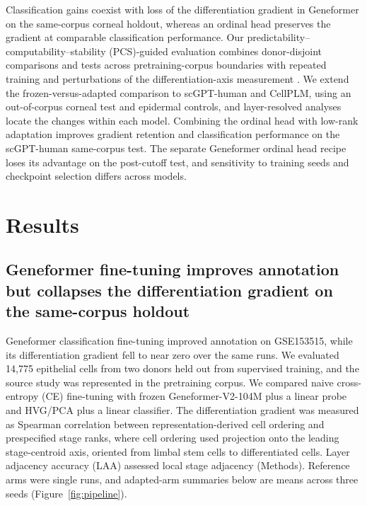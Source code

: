 \documentclass[12pt,letterpaper]{article}
\begin{document}
Classification gains coexist with loss of the differentiation gradient in Geneformer on the same-corpus corneal holdout, whereas an ordinal head preserves the gradient at comparable classification performance. Our predictability--computability--stability (PCS)-guided evaluation combines donor-disjoint comparisons and tests across pretraining-corpus boundaries with repeated training and perturbations of the differentiation-axis measurement \cite{ness2026}. We extend the frozen-versus-adapted comparison to scGPT-human and CellPLM, using an out-of-corpus corneal test and epidermal controls, and layer-resolved analyses locate the changes within each model. Combining the ordinal head with low-rank adaptation improves gradient retention and classification performance on the scGPT-human same-corpus test. The separate Geneformer ordinal head recipe loses its advantage on the post-cutoff test, and sensitivity to training seeds and checkpoint selection differs across models.

\section*{Results}

\subsection*{Geneformer fine-tuning improves annotation but collapses the differentiation gradient on the same-corpus holdout}

Geneformer classification fine-tuning improved annotation on GSE153515, while its differentiation gradient fell to near zero over the same runs. We evaluated 14,775 epithelial cells from two donors held out from supervised training, and the source study was represented in the pretraining corpus. We compared naive cross-entropy (CE) fine-tuning with frozen Geneformer-V2-104M plus a linear probe and HVG/PCA plus a linear classifier. The differentiation gradient was measured as Spearman correlation between representation-derived cell ordering and prespecified stage ranks, where cell ordering used projection onto the leading stage-centroid axis, oriented from limbal stem cells to differentiated cells. Layer adjacency accuracy (LAA) assessed local stage adjacency (Methods). Reference arms were single runs, and adapted-arm summaries below are means across three seeds (Figure~\ref{fig:pipeline}).
\end{document}
